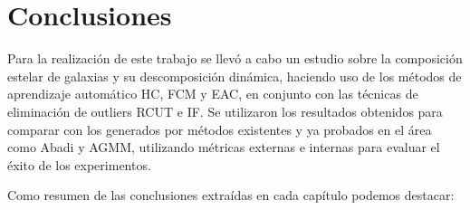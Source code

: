 \chapter{Conclusiones}
\label{chapter:conclusiones}

Para la realización de este trabajo se llevó a cabo un estudio sobre la composición estelar de galaxias y su descomposición dinámica, haciendo uso de los métodos de aprendizaje automático \gls{HC}, \gls{FCM} y \gls{EAC}, en conjunto con las técnicas de eliminación de outliers \gls{RCUT} e \gls{IF}. Se utilizaron los resultados obtenidos para comparar con los generados por métodos existentes y ya probados en el área como Abadi y \gls{AGMM}, utilizando métricas externas e internas para evaluar el éxito de los experimentos.

Como resumen de las conclusiones extraídas en cada capítulo podemos destacar:

